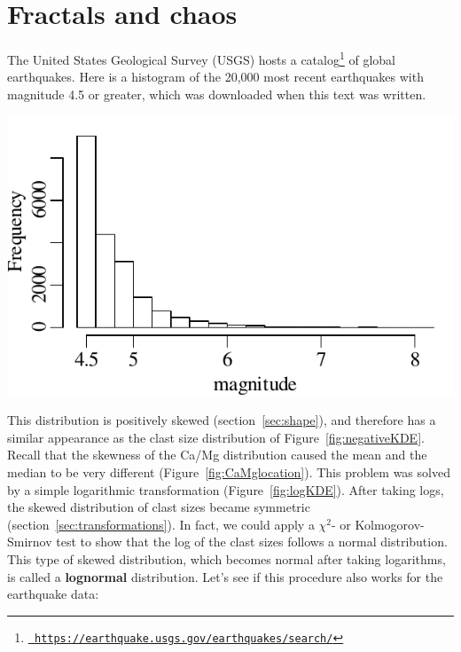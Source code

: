 \chapter{Fractals and chaos}
\label{ch:fractals}

The United States Geological Survey (USGS) hosts a
catalog\footnote{\href{https://earthquake.usgs.gov/earthquakes/search/}{\tt
    https://earthquake.usgs.gov/earthquakes/search/}} of global
earthquakes. Here is a histogram of the 20,000 most recent earthquakes
with magnitude 4.5 or greater, which was downloaded when this text was
written.

\noindent\begin{minipage}[t][][b]{.4\textwidth}
  \includegraphics[width=\textwidth]{../figures/recentquakes.pdf}\medskip
\end{minipage}
\begin{minipage}[t][][t]{.6\textwidth}
  \label{fig:recentquakes}
\end{minipage}

This distribution is positively skewed (section~\ref{sec:shape}), and
therefore has a similar appearance as the clast size distribution of
Figure~\ref{fig:negativeKDE}. Recall that the skewness of the Ca/Mg
distribution caused the mean and the median to be very different
(Figure~\ref{fig:CaMglocation}). This problem was solved by a simple
logarithmic transformation (Figure~\ref{fig:logKDE}). After taking
logs, the skewed distribution of clast sizes became symmetric
(section~\ref{sec:transformations}).  In fact, we could apply a
$\chi^2$- or Kolmogorov-Smirnov test to show that the log of the clast
sizes follows a normal distribution.  This type of skewed
distribution, which becomes normal after taking logarithms, is called
a \textbf{lognormal} distribution. Let's see if this procedure also
works for the earthquake data:\medskip

